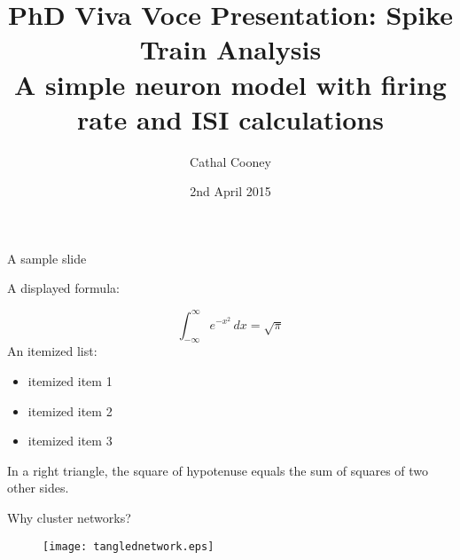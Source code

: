 \documentclass{beamer}
\author{Cathal Cooney}
\date{2nd April 2015}
\title{PhD Viva Voce Presentation:  Spike Train Analysis\\  A simple neuron model with firing rate and ISI calculations}
\begin{document}
\begin{frame}
\titlepage
\end{frame}

\begin{frame}{A sample slide}

A displayed formula:

\[
  \int_{-\infty}^\infty e^{-x^2} \, dx = \sqrt{\pi}
\]
\pause
An itemized list:

\begin{itemize}
  \item itemized item 1
  \pause
  \item itemized item 2
  \pause
  \item itemized item 3
\end{itemize}
\pause
\begin{theorem}
  In a right triangle, the square of hypotenuse equals
  the sum of squares of two other sides.
\end{theorem}

\end{frame}

\begin{frame}
\centering
Why cluster networks?
\pause
\begin{figure}
\centering
\texttt{[image: tanglednetwork.eps]}
\end{figure}
\end{frame}
\end{document}
